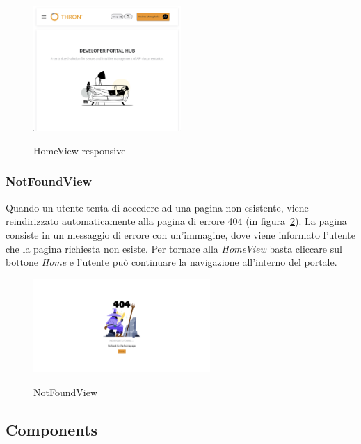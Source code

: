 \begin{figure}[ht]
  \centering
  \includegraphics[width=0.5\textwidth, alt={Pagina principale responsive dell'applicazione}]{images/frontend/HomeViewRes.jpg}
  \caption{HomeView responsive}\label{fig:home-view-responsive}
\end{figure}


\subsubsection{NotFoundView}\label{subsubsec:not-found-view}
Quando un utente tenta di accedere ad una pagina non esistente, viene reindirizzato automaticamente alla pagina di errore 404 (in figura~\ref{fig:not-found-view}).
La pagina consiste in un messaggio di errore con un'immagine, dove viene informato l'utente che la pagina richiesta non esiste.
Per tornare alla \textit{HomeView} basta cliccare sul bottone \textit{Home} e l'utente può continuare la navigazione all'interno del portale.

\begin{figure}[ht]
  \centering
  \includegraphics[width=0.6\textwidth, alt={Pagina di errore 404}]{images/frontend/NotFoundView.jpg}
  \caption{NotFoundView}\label{fig:not-found-view}
\end{figure}
\pagebreak
\subsection{Components}\label{subsec:components}

